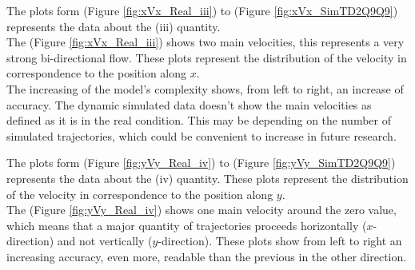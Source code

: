 \documentclass[class=article, crop=false]{standalone}
\begin{document}
The plots form (Figure \ref{fig:xVx_Real_iii}) to (Figure \ref{fig:xVx_SimTD2Q9Q9}) represents the data about the (iii) quantity.
\\ The (Figure \ref{fig:xVx_Real_iii}) shows two main velocities, this represents a very strong bi-directional flow.
These plots represent the distribution of the velocity in correspondence to the position along $x$.
\\ The increasing of the model's complexity shows, from left to right, an increase of accuracy.
The dynamic simulated data doesn't show the main velocities as defined as it is in the real condition.
This may be depending on the number of simulated trajectories, which could be convenient to increase in future research.

The plots form (Figure \ref{fig:yVy_Real_iv}) to (Figure \ref{fig:yVy_SimTD2Q9Q9}) represents the data about the (iv) quantity.
These plots represent the distribution of the velocity in correspondence to the position along $y$.
\\ The (Figure \ref{fig:yVy_Real_iv}) shows one main velocity around the zero value, which means that a major quantity of trajectories proceeds horizontally ($x$-direction) and not vertically ($y$-direction).
These plots show from left to right an increasing accuracy, even more, readable than the previous in the other direction.
\end{document}
